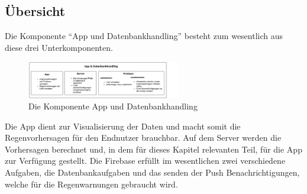 \subsection{Übersicht}\label{übersicht}
Die Komponente “App und Datenbankhandling” besteht zum wesentlich aus diese drei Unterkomponenten.  

\begin{figure}[h]
 \centering
 \includegraphics[width=0.6\textwidth,angle=0]{abb/app_datenbank_komponente_uebersicht}
 \caption[Komponentenübersicht App und Datenbankhandling]{Die Komponente App und Datenbankhandling}
\label{fig:Beschreibung}
\end{figure}

Die App dient zur Visualisierung der Daten und macht somit die Regenvorhersagen für den Endnutzer brauchbar. 
Auf dem Server werden die Vorhersagen berechnet und, in dem für dieses Kapitel relevanten Teil, 
für die App zur Verfügung gestellt. 
Die Firebase erfüllt im wesentlichen zwei verschiedene Aufgaben, die Datenbankaufgaben und das senden der 
Push Benachrichtigungen, welche für die Regenwarnungen gebraucht wird.
 
